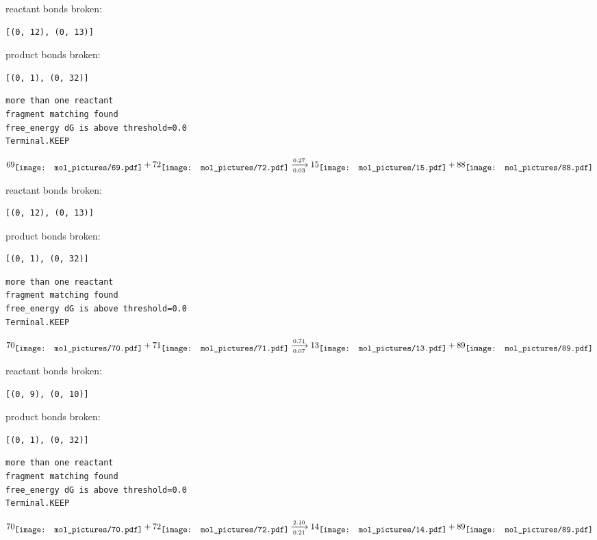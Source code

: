 \documentclass{article}
\begin{document}
reactant bonds broken:\begin{verbatim}
[(0, 12), (0, 13)]
\end{verbatim}
product bonds broken:\begin{verbatim}
[(0, 1), (0, 32)]
\end{verbatim}




\vspace{1cm}
\begin{verbatim}
more than one reactant
fragment matching found
free_energy dG is above threshold=0.0
Terminal.KEEP
\end{verbatim}
$$
69
\raisebox{-.5\height}{\texttt{[image: mol\_pictures/69.pdf]}}
+
72
\raisebox{-.5\height}{\texttt{[image: mol\_pictures/72.pdf]}}
\xrightarrow[0.03]{0.27}
15
\raisebox{-.5\height}{\texttt{[image: mol\_pictures/15.pdf]}}
+
88
\raisebox{-.5\height}{\texttt{[image: mol\_pictures/88.pdf]}}
$$


reactant bonds broken:\begin{verbatim}
[(0, 12), (0, 13)]
\end{verbatim}
product bonds broken:\begin{verbatim}
[(0, 1), (0, 32)]
\end{verbatim}




\vspace{1cm}
\begin{verbatim}
more than one reactant
fragment matching found
free_energy dG is above threshold=0.0
Terminal.KEEP
\end{verbatim}
$$
70
\raisebox{-.5\height}{\texttt{[image: mol\_pictures/70.pdf]}}
+
71
\raisebox{-.5\height}{\texttt{[image: mol\_pictures/71.pdf]}}
\xrightarrow[0.07]{0.71}
13
\raisebox{-.5\height}{\texttt{[image: mol\_pictures/13.pdf]}}
+
89
\raisebox{-.5\height}{\texttt{[image: mol\_pictures/89.pdf]}}
$$


reactant bonds broken:\begin{verbatim}
[(0, 9), (0, 10)]
\end{verbatim}
product bonds broken:\begin{verbatim}
[(0, 1), (0, 32)]
\end{verbatim}




\vspace{1cm}
\begin{verbatim}
more than one reactant
fragment matching found
free_energy dG is above threshold=0.0
Terminal.KEEP
\end{verbatim}
$$
70
\raisebox{-.5\height}{\texttt{[image: mol\_pictures/70.pdf]}}
+
72
\raisebox{-.5\height}{\texttt{[image: mol\_pictures/72.pdf]}}
\xrightarrow[0.21]{2.10}
14
\raisebox{-.5\height}{\texttt{[image: mol\_pictures/14.pdf]}}
+
89
\raisebox{-.5\height}{\texttt{[image: mol\_pictures/89.pdf]}}
$$
\end{document}
